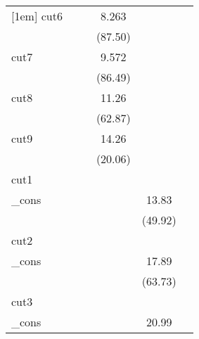{\begin{tabular}{l*{5}{c}}
[1em]
cut6        &                     &                     &       8.263\sym{***}&                     &                     \\
            &                     &                     &     (87.50)         &                     &                     \\
[1em]
cut7        &                     &                     &       9.572\sym{***}&                     &                     \\
            &                     &                     &     (86.49)         &                     &                     \\
[1em]
cut8        &                     &                     &       11.26\sym{***}&                     &                     \\
            &                     &                     &     (62.87)         &                     &                     \\
[1em]
cut9        &                     &                     &       14.26\sym{***}&                     &                     \\
            &                     &                     &     (20.06)         &                     &                     \\
\hline
cut1        &                     &                     &                     &                     &                     \\
\_cons      &                     &                     &                     &       13.83\sym{***}&                     \\
            &                     &                     &                     &     (49.92)         &                     \\
\hline
cut2        &                     &                     &                     &                     &                     \\
\_cons      &                     &                     &                     &       17.89\sym{***}&                     \\
            &                     &                     &                     &     (63.73)         &                     \\
\hline
cut3        &                     &                     &                     &                     &                     \\
\_cons      &                     &                     &                     &       20.99\sym{***}&                     \\

\end{tabular}}
